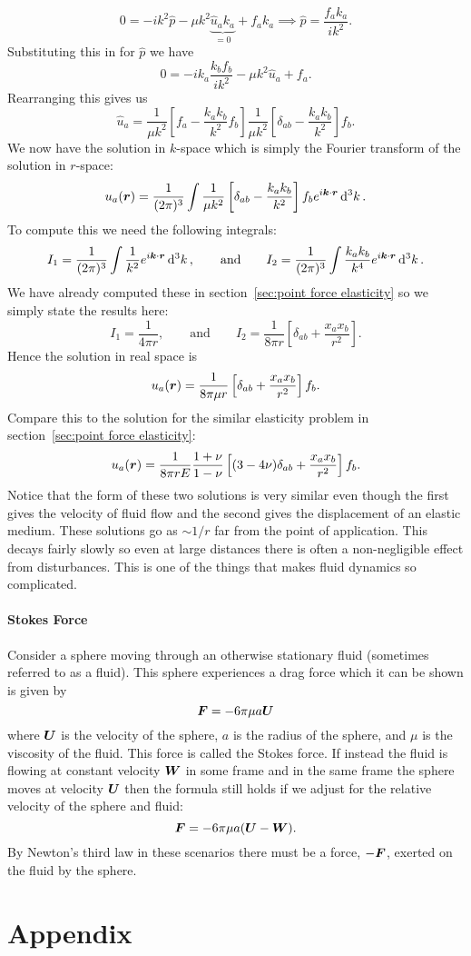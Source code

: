 \documentclass[a4paper]{article}
\begin{document}
    \[0 = -ik^2\hat{p} -\mu k^2\underbrace{\hat{u}_ak_a}_{=0} + f_ak_a \implies \hat{p} = \frac{f_ak_a}{ik^2}.\]
    Substituting this in for \(\hat{p}\) we have
    \[0 = -ik_a\frac{k_bf_b}{ik^2} - \mu k^2\hat{u}_a + f_a.\]
    Rearranging this gives us
    \[\hat{u}_a = \frac{1}{\mu k^2}[f_a - \frac{k_ak_b}{k^2}f_b]\frac{1}{\mu k^2}\left[ \delta_{ab} - \frac{k_ak_b}{k^2} \right]f_b.\]
    We now have the solution in \(k\)-space which is simply the Fourier transform of the solution in \(r\)-space:
    \[u_a(\bm{r}) = \frac{1}{(2\pi)^3} \int \frac{1}{\mu k^2}\left[ \delta_{ab} - \frac{k_ak_b}{k^2} \right]f_b e^{i\bm{k}\cdot\bm{r}}\dd[3]{k}.\]
    To compute this we need the following integrals:
    \[I_1 = \frac{1}{(2\pi)^3} \int \frac{1}{k^2} e^{i\bm{k}\cdot\bm{r}}\dd[3]{k}, \qquad\text{and}\qquad I_2 = \frac{1}{(2\pi)^3} \int \frac{k_ak_b}{k^4} e^{i\bm{k}\cdot\bm{r}}\dd[3]{k}.\]
    We have already computed these in section~\ref{sec:point force elasticity} so we simply state the results here:
    \[I_1 = \frac{1}{4\pi r}, \qquad\text{and}\qquad I_2 = \frac{1}{8\pi r}\left[ \delta_{ab} + \frac{x_ax_b}{r^2} \right].\]
    Hence the solution in real space is
    \[u_a(\bm{r}) = \frac{1}{8\pi \mu r}\left[ \delta_{ab} + \frac{x_ax_b}{r^2} \right]f_b.\]
    Compare this to the solution for the similar elasticity problem in section~\ref{sec:point force elasticity}:
    \[u_a(\bm{r}) = \frac{1}{8 \pi r E}\frac{1 + \nu}{1 - \nu} \left[ (3 - 4\nu)\delta_{ab} + \frac{x_ax_b}{r^2} \right]f_b.\]
    Notice that the form of these two solutions is very similar even though the first gives the velocity of fluid flow and the second gives the displacement of an elastic medium.
    These solutions go as \(\sim 1/r\) far from the point of application.
    This decays fairly slowly so even at large distances there is often a non-negligible effect from disturbances.
    This is one of the things that makes fluid dynamics so complicated.
    
    \subsection{Stokes Force}
    Consider a sphere moving through an otherwise stationary fluid (sometimes referred to as a  fluid).
    This sphere experiences a drag force which it can be shown is given by
    \[\bm{F} = -6\pi\mu a\bm{U}\]
    where \(\bm{U}\) is the velocity of the sphere, \(a\) is the radius of the sphere, and \(\mu\) is the viscosity of the fluid.
    This force is called the Stokes force.
    If instead the fluid is flowing at constant velocity \(\bm{W}\) in some frame and in the same frame the sphere moves at velocity \(\bm{U}\) then the formula still holds if we adjust for the relative velocity of the sphere and fluid:
    \[\bm{F} = -6\pi\mu a(\bm{U} - \bm{W}).\]
    By Newton's third law in these scenarios there must be a force, \(-\bm{F}\), exerted on the fluid by the sphere.
    \tikzexternaldisable
    
    \clearpage
    \appendix
    \part*{Appendix}
    \begingroup
    \let\clearpage\relax
    
    \endgroup 
\end{document}
